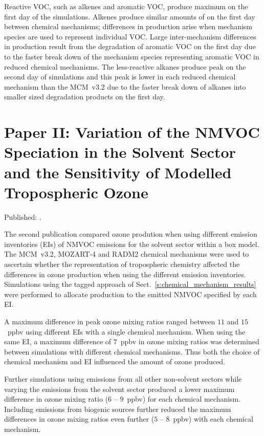 Reactive VOC, such as alkenes and aromatic VOC, produce maximum  on the first day of the simulations.
Alkenes produce similar amounts of  on the first day between chemical mechanisms; differences in  production arise when mechanism species are used to represent individual VOC.
Large inter-mechanism differences in  production result from the degradation of aromatic VOC on the first day due to the faster break down of the mechanism species representing aromatic VOC in reduced chemical mechanisms.
The less-reactive alkanes produce peak  on the second day of simulations and this peak is lower in each reduced chemical mechanism than the MCM~v3.2 due to the faster break down of alkanes into smaller sized degradation products on the first day.

\singlespacing
\section[Paper II]{Paper II: Variation of the NMVOC Speciation in the Solvent Sector and the Sensitivity of Modelled Tropospheric Ozone} \label{s:EI_results}

\onehalfspacing

\noindent
Published: .

The second publication compared ozone prodution when using different emission inventories (EIs) of NMVOC emissions for the solvent sector within a box model.
The MCM~v3.2, MOZART-4 and RADM2 chemical mechanisms were used to ascertain whether the representation of tropospheric chemistry affected the differences in ozone production when using the different emission inventories.
Simulations using the tagged approach of Sect.~\ref{s:chemical_mechanism_results} were performed to allocate  production to the emitted NMVOC specified by each EI.

A maximum difference in peak ozone mixing ratios ranged between $11$ and $15$~ppbv using different EIs with a single chemical mechanism.
When using the same EI, a maximum difference of $7$~ppbv in ozone mixing ratios was determined between simulations with different chemical mechanisms.
Thus both the choice of chemical mechanism and EI influenced the amount of ozone produced.

Further simulations using emissions from all other non-solvent sectors while varying the emissions from the solvent sector produced a lower maximum difference in ozone mixing ratio ($6$ -- $9$~ppbv) for each chemical mechanism.
Including emissions from biogenic sources further reduced the maximum differences in ozone mixing ratios even further ($5$ -- $8$~ppbv) with each chemical mechanism.

